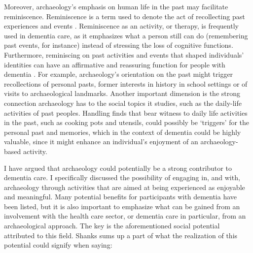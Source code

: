 	Moreover, archaeology’s emphasis on human life in the past may facilitate reminiscence. Reminiscence is a term used to denote the act of recollecting past experiences and events \parencites{Society_2015a}{Society_2015b}. 
	Reminiscence as an activity, or therapy, is frequently used in dementia care, as it emphasizes what a person still can do (remembering past events, for instance) instead of stressing the loss of cognitive functions. Furthermore, reminiscing on past activities and events that shaped individuals’ identities can have an affirmative and reassuring function for people with dementia \parencite{Unknown_2015}. For example, archaeology’s orientation on the past might trigger recollections of personal pasts, former interests in history in school settings or of visits to archaeological landmarks. Another important dimension is the strong connection archaeology has to the social topics it studies, such as the daily-life activities of past peoples. Handling finds that bear witness to daily life activities in the past, such as cooking pots and utensils, could possibly be ‘triggers’ for the personal past and memories, which in the context of dementia could be highly valuable, since it might enhance an individual’s enjoyment of an archaeology-based activity.	
	
	
	I  have argued that archaeology could potentially be a strong contributor to dementia care. I specifically discussed the possibility of engaging in, and with, archaeology through activities that are aimed at being experienced as enjoyable and meaningful. Many potential benefits for participants with dementia have been listed, but it is also important to emphasize what can be gained from an involvement with the health care sector, or dementia care in particular, from an archaeological approach. The key is the aforementioned social potential attributed to this field. Shanks sums up a part of what the realization of this potential could signify when saying:
	
